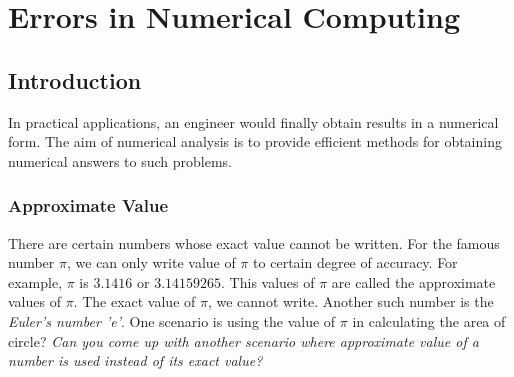 \documentclass[aima203_lecturenotes_ku.tex]{subfiles}
\begin{document}
\chapter{Errors in Numerical Computing}

\section{Introduction}
In practical applications, an engineer would finally obtain results in a numerical form. The aim of numerical analysis is to provide efficient methods for obtaining numerical answers to such problems.

\subsection{Approximate Value}
There are certain numbers whose exact value cannot be written. For the famous number \(\pi\), we can only write value of \(\pi\) to certain degree of accuracy. For example, \(\pi\) is \(3.1416\) or \(3.14159265\). This values of \(\pi\) are called the approximate values of \(\pi\). The exact value of \(\pi\), we cannot write. Another such number is the \textit{Euler's number 'e'}. One scenario is using the value of $\pi$ in calculating the area of circle? \textit{Can you come up with another scenario where approximate value of a number is used instead of its exact value?}
\end{document}
